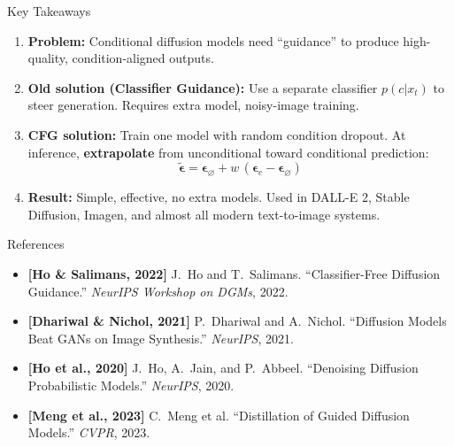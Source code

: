 \documentclass[aspectratio=169, 11pt]{beamer}
\begin{document}
\begin{frame}{Key Takeaways}

\begin{enumerate}
    \item \textbf{Problem:} Conditional diffusion models need ``guidance'' to produce high-quality, condition-aligned outputs.

    \bigskip
    \item \textbf{Old solution (Classifier Guidance):} Use a separate classifier $p(c|x_t)$ to steer generation. Requires extra model, noisy-image training.

    \bigskip
    \item \textbf{CFG solution:} Train one model with random condition dropout. At inference, \textbf{extrapolate} from unconditional toward conditional prediction:
    \[
        \tilde{\boldsymbol{\epsilon}} = \boldsymbol{\epsilon}_\varnothing + w\,(\boldsymbol{\epsilon}_c - \boldsymbol{\epsilon}_\varnothing)
    \]

    \bigskip
    \item \textbf{Result:} Simple, effective, no extra models. Used in DALL-E 2, Stable Diffusion, Imagen, and almost all modern text-to-image systems.
\end{enumerate}

\end{frame}

\begin{frame}{References}

\begin{itemize}
    \item \textbf{[Ho \& Salimans, 2022]} J.~Ho and T.~Salimans. ``Classifier-Free Diffusion Guidance.'' \emph{NeurIPS Workshop on DGMs}, 2022.

    \bigskip
    \item \textbf{[Dhariwal \& Nichol, 2021]} P.~Dhariwal and A.~Nichol. ``Diffusion Models Beat GANs on Image Synthesis.'' \emph{NeurIPS}, 2021.

    \bigskip
    \item \textbf{[Ho et al., 2020]} J.~Ho, A.~Jain, and P.~Abbeel. ``Denoising Diffusion Probabilistic Models.'' \emph{NeurIPS}, 2020.

    \bigskip
    \item \textbf{[Meng et al., 2023]} C.~Meng et al. ``Distillation of Guided Diffusion Models.'' \emph{CVPR}, 2023.
\end{itemize}

\end{frame}
\end{document}
